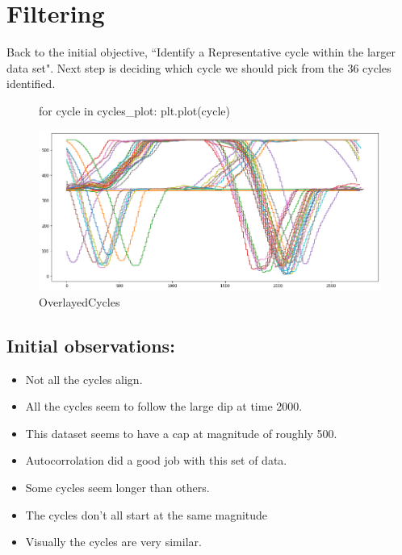 \section{Filtering} \label{filtering}
Back to the initial objective, ``Identify a Representative cycle within the larger data set". Next step is deciding which cycle we should pick from the 36 cycles identified. 
\begin{figure}[h]

\begin{python}
for cycle in cycles_plot:
    plt.plot(cycle)
\end{python}

\includegraphics[scale=0.45]{images/cyclesOverlayed.png}
\caption{OverlayedCycles}
\label{OverlayedCycles}
\end{figure}


\subsection{Initial observations:}
\begin{itemize}

    \item Not all the cycles align.
    
    \item All the cycles seem to follow the large dip at time 2000.
    
    \item This dataset seems to have a cap at magnitude of roughly
    500.
    \item Autocorrolation did a good job with this set of data.
    
    \item Some cycles seem longer than others.
    
    \item  The cycles don't all start at the same magnitude 
    
    \item Visually the cycles are very similar.
    
\end{itemize}

